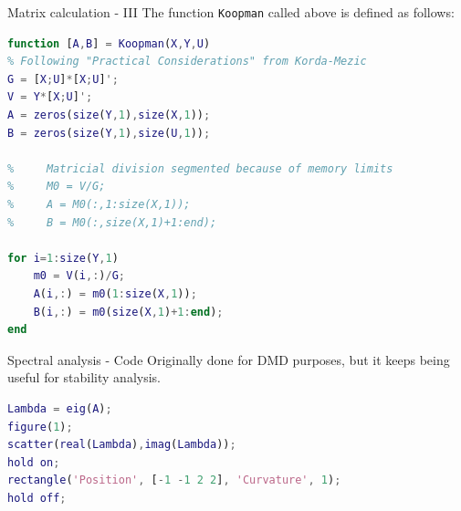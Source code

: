 \documentclass{beamer}
\begin{document}
\begin{frame}[fragile]{Matrix calculation - III}
    The function \texttt{Koopman} called above is defined as follows:

    \begin{lstlisting}[language=Matlab,basicstyle=\tiny]
function [A,B] = Koopman(X,Y,U)
% Following "Practical Considerations" from Korda-Mezic
G = [X;U]*[X;U]';
V = Y*[X;U]';
A = zeros(size(Y,1),size(X,1));
B = zeros(size(Y,1),size(U,1));

%     Matricial division segmented because of memory limits
%     M0 = V/G;
%     A = M0(:,1:size(X,1));
%     B = M0(:,size(X,1)+1:end);

for i=1:size(Y,1)
    m0 = V(i,:)/G;
    A(i,:) = m0(1:size(X,1));
    B(i,:) = m0(size(X,1)+1:end);
end
    \end{lstlisting}
\end{frame}

\begin{frame}[fragile]{Spectral analysis - Code}
    Originally done for DMD purposes, but it keeps being useful for stability analysis.

    \begin{lstlisting}[language=Matlab]
Lambda = eig(A);
figure(1);
scatter(real(Lambda),imag(Lambda));
hold on;
rectangle('Position', [-1 -1 2 2], 'Curvature', 1);
hold off;
    \end{lstlisting}
\end{frame}
\end{document}

